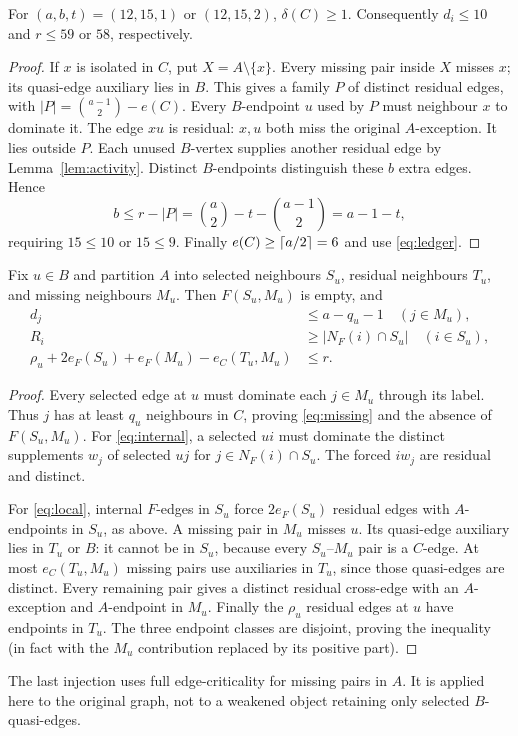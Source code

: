 \documentclass[11pt,a4paper]{article}
\begin{document}
\begin{lemma}\label{lem:lowk}
For $(a,b,t)=(12,15,1)$ or $(12,15,2)$, $\delta(C)\ge1$. Consequently $d_i\le10$ and $r\le59$ or $58$, respectively.
\end{lemma}
\begin{proof}
If $x$ is isolated in $C$, put $X=A\setminus\{x\}$. Every missing pair inside $X$ misses $x$; its quasi-edge auxiliary lies in $B$. This gives a family $P$ of distinct residual edges, with
$|P|=\binom{a-1}{2}-e(C)$. Every $B$-endpoint $u$ used by $P$ must neighbour $x$ to dominate it. The edge $xu$ is residual: $x,u$ both miss the original $A$-exception. It lies outside $P$. Each unused $B$-vertex supplies another residual edge by Lemma~\ref{lem:activity}. Distinct $B$-endpoints distinguish these $b$ extra edges. Hence
\[
 b\le r-|P|=\binom a2-t-\binom{a-1}{2}=a-1-t,
\]
requiring $15\le10$ or $15\le9$. Finally $e(C)\ge\left\lceil a/2\right\rceil=6$ and use \eqref{eq:ledger}.
\end{proof}
\begin{lemma}\label{lem:local}
Fix $u\in B$ and partition $A$ into selected neighbours $S_u$, residual neighbours $T_u$, and missing neighbours $M_u$. Then $F(S_u,M_u)$ is empty, and
\begin{align}
 d_j&\le a-q_u-1\quad(j\in M_u),\label{eq:missing}\\
 R_i&\ge |N_F(i)\cap S_u|\quad(i\in S_u),\label{eq:internal}\\
 \rho_u+2e_F(S_u)+e_F(M_u)-e_C(T_u,M_u)&\le r.\label{eq:local}
\end{align}
\end{lemma}
\begin{proof}
Every selected edge at $u$ must dominate each $j\in M_u$ through its label. Thus $j$ has at least $q_u$ neighbours in $C$, proving \eqref{eq:missing} and the absence of $F(S_u,M_u)$. For \eqref{eq:internal}, a selected $ui$ must dominate the distinct supplements $w_j$ of selected $uj$ for $j\in N_F(i)\cap S_u$. The forced $iw_j$ are residual and distinct.

For \eqref{eq:local}, internal $F$-edges in $S_u$ force $2e_F(S_u)$ residual edges with $A$-endpoints in $S_u$, as above. A missing pair in $M_u$ misses $u$. Its quasi-edge auxiliary lies in $T_u$ or $B$: it cannot be in $S_u$, because every $S_u$--$M_u$ pair is a $C$-edge. At most $e_C(T_u,M_u)$ missing pairs use auxiliaries in $T_u$, since those quasi-edges are distinct. Every remaining pair gives a distinct residual cross-edge with an $A$-exception and $A$-endpoint in $M_u$. Finally the $\rho_u$ residual edges at $u$ have endpoints in $T_u$. The three endpoint classes are disjoint, proving the inequality (in fact with the $M_u$ contribution replaced by its positive part).
\end{proof}
The last injection uses full edge-criticality for missing pairs in $A$. It is applied here to the original graph, not to a weakened object retaining only selected $B$-quasi-edges.
\end{document}

